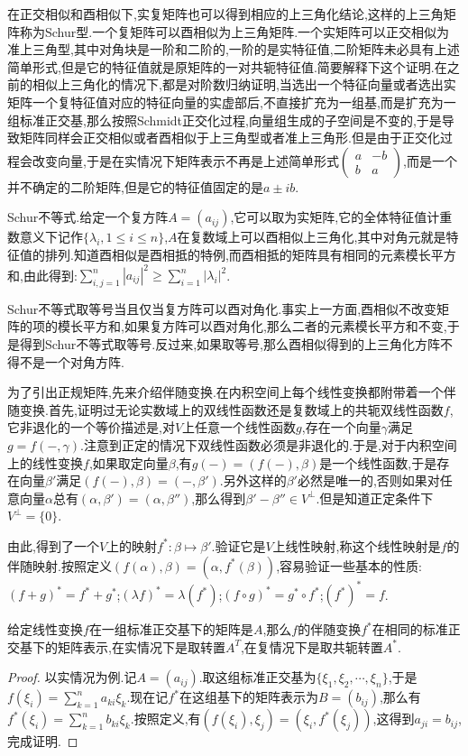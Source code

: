 在正交相似和酉相似下,实复矩阵也可以得到相应的上三角化结论,这样的上三角矩阵称为Schur型.一个复矩阵可以酉相似为上三角矩阵.一个实矩阵可以正交相似为准上三角型,其中对角块是一阶和二阶的,一阶的是实特征值,二阶矩阵未必具有上述简单形式,但是它的特征值就是原矩阵的一对共轭特征值.简要解释下这个证明.在之前的相似上三角化的情况下,都是对阶数归纳证明,当选出一个特征向量或者选出实矩阵一个复特征值对应的特征向量的实虚部后,不直接扩充为一组基,而是扩充为一组标准正交基,那么按照Schmidt正交化过程,向量组生成的子空间是不变的,于是导致矩阵同样会正交相似或者酉相似于上三角型或者准上三角形.但是由于正交化过程会改变向量,于是在实情况下矩阵表示不再是上述简单形式$\left(\begin{array}{cc}
a&-b\\
b&a\end{array}\right)$,而是一个并不确定的二阶矩阵,但是它的特征值固定的是$a\pm ib$.

Schur不等式.给定一个复方阵$A=(a_{ij})$,它可以取为实矩阵,它的全体特征值计重数意义下记作$\{\lambda_i,1\le i\le n\}$,$A$在复数域上可以酉相似上三角化,其中对角元就是特征值的排列.知道酉相似是酉相抵的特例,而酉相抵的矩阵具有相同的元素模长平方和,由此得到:$\sum_{i,j=1}^{n}|a_{ij}|^2\ge\sum_{i=1}^{n}|\lambda_i|^2$.

Schur不等式取等号当且仅当复方阵可以酉对角化.事实上一方面,酉相似不改变矩阵的项的模长平方和,如果复方阵可以酉对角化,那么二者的元素模长平方和不变,于是得到Schur不等式取等号.反过来,如果取等号,那么酉相似得到的上三角化方阵不得不是一个对角方阵.

为了引出正规矩阵,先来介绍伴随变换.在内积空间上每个线性变换都附带着一个伴随变换.首先,证明过无论实数域上的双线性函数还是复数域上的共轭双线性函数$f$,它非退化的一个等价描述是,对$V$上任意一个线性函数$g$,存在一个向量$\gamma$满足$g=f(-,\gamma)$.注意到正定的情况下双线性函数必须是非退化的.于是,对于内积空间上的线性变换$f$,如果取定向量$\beta$,有$g(-)=(f(-),\beta)$是一个线性函数,于是存在向量$\beta'$满足$(f(-),\beta)=(-,\beta')$.另外这样的$\beta'$必然是唯一的,否则如果对任意向量$\alpha$总有$(\alpha,\beta')=(\alpha,\beta'')$,那么得到$\beta'-\beta''\in V^{\perp}$.但是知道正定条件下$V^{\perp}=\{0\}$.

由此,得到了一个$V$上的映射$f^*:\beta\mapsto\beta'$.验证它是$V$上线性映射,称这个线性映射是$f$的伴随映射.按照定义$(f(\alpha),\beta)=(\alpha,f^*(\beta))$,容易验证一些基本的性质:$(f+g)^*=f^*+g^*$;$(\lambda f)^*=\lambda(f^*)$;$(f\circ g)^*=g^*\circ f^*$;$(f^*)^*=f$.

给定线性变换$f$在一组标准正交基下的矩阵是$A$,那么$f$的伴随变换$f^*$在相同的标准正交基下的矩阵表示,在实情况下是取转置$A^T$,在复情况下是取共轭转置$A^*$.
\begin{proof}
	
	以实情况为例.记$A=(a_{ij})$.取这组标准正交基为$\{\xi_1,\xi_2,\cdots,\xi_n\}$,于是$f(\xi_i)=\sum_{k=1}^{n}a_{ki}\xi_k$.现在记$f^*$在这组基下的矩阵表示为$B=(b_{ij})$,那么有$f^*(\xi_i)=\sum_{k=1}^{n}b_{ki}\xi_k$.按照定义,有$(f(\xi_i),\xi_j)=(\xi_i,f^*(\xi_j))$,这得到$a_{ji}=b_{ij}$,完成证明.
	
\end{proof}


